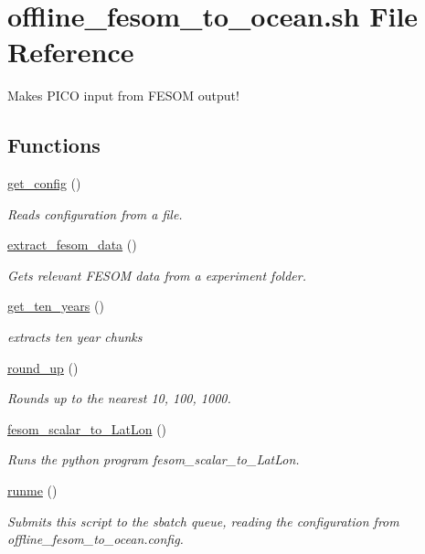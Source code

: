 \hypertarget{offline__fesom__to__ocean_8sh}{\section{offline\-\_\-fesom\-\_\-to\-\_\-ocean.\-sh File Reference}
\label{offline__fesom__to__ocean_8sh}
}


Makes {\ttfamily P\-I\-C\-O} input from {\ttfamily F\-E\-S\-O\-M} output!  


\subsection*{Functions}
\begin{DoxyCompactItemize}
\item 
\hypertarget{offline__fesom__to__ocean_8sh_a48904c1e77d4ea153b3dfd1415a66bd7}{\hyperlink{offline__fesom__to__ocean_8sh_a48904c1e77d4ea153b3dfd1415a66bd7}{get\-\_\-config} ()}\label{offline__fesom__to__ocean_8sh_a48904c1e77d4ea153b3dfd1415a66bd7}

\begin{DoxyCompactList}\small\item\em Reads configuration from a file. \end{DoxyCompactList}\item 
\hyperlink{offline__fesom__to__ocean_8sh_aeba27589bbabd426576fd8831b83c1a2}{extract\-\_\-fesom\-\_\-data} ()
\begin{DoxyCompactList}\small\item\em Gets relevant {\ttfamily F\-E\-S\-O\-M} data from a experiment folder. \end{DoxyCompactList}\item 
\hyperlink{offline__fesom__to__ocean_8sh_a9663aadce0f09d76b2b69367ae37cfc9}{get\-\_\-ten\-\_\-years} ()
\begin{DoxyCompactList}\small\item\em extracts ten year chunks \end{DoxyCompactList}\item 
\hyperlink{offline__fesom__to__ocean_8sh_ad37dfa80b64b7ee439bed835e274659a}{round\-\_\-up} ()
\begin{DoxyCompactList}\small\item\em Rounds up to the nearest 10, 100, 1000. \end{DoxyCompactList}\item 
\hyperlink{offline__fesom__to__ocean_8sh_a940c582c9f5c41215cc3e11963b4b7c5}{fesom\-\_\-scalar\-\_\-to\-\_\-\-Lat\-Lon} ()
\begin{DoxyCompactList}\small\item\em Runs the python program fesom\-\_\-scalar\-\_\-to\-\_\-\-Lat\-Lon. \end{DoxyCompactList}\item 
\hyperlink{offline__fesom__to__ocean_8sh_acb3dbe1b2a4e45284979655cd9adc4a0}{runme} ()
\begin{DoxyCompactList}\small\item\em Submits this script to the sbatch queue, reading the configuration from offline\-\_\-fesom\-\_\-to\-\_\-ocean.\-config. \end{DoxyCompactList}\end{DoxyCompactItemize}
